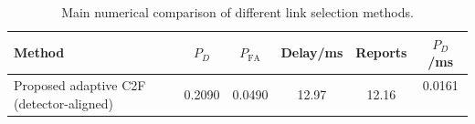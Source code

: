 \begin{table}[t]
    \centering
    \caption{Main numerical comparison of different link selection methods.}
    \label{tab:main_summary}
    \begin{tabular}{l c c c c c}
        \hline
        Method & $P_D$ & $P_{\mathrm{FA}}$ & Delay/ms & Reports & $P_D$/ms \\
        \hline
        Proposed adaptive C2F (detector-aligned) & 0.2090 & 0.0490 & 12.97 & 12.16 & 0.0161 \
        \hline
    \end{tabular}
\end{table}
